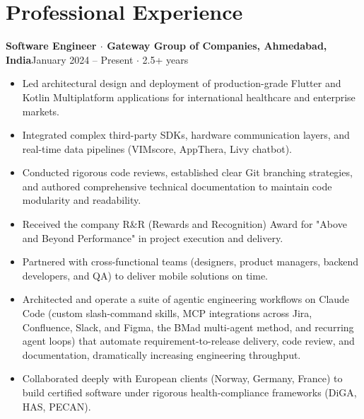 \documentclass[a4paper,10pt]{article}
\newcommand{\entry}[2]{\textbf{#1}\hfill{\small #2}\par}
\begin{document}
\section*{Professional Experience}
\entry{Software Engineer $\cdot$ Gateway Group of Companies, Ahmedabad, India}{January 2024 -- Present $\cdot$ 2.5+ years}
\begin{itemize}
  \item Led architectural design and deployment of production-grade Flutter and Kotlin Multiplatform applications for international healthcare and enterprise markets.
  \item Integrated complex third-party SDKs, hardware communication layers, and real-time data pipelines (VIMscore, AppThera, Livy chatbot).
  \item Conducted rigorous code reviews, established clear Git branching strategies, and authored comprehensive technical documentation to maintain code modularity and readability.
  \item Received the company R\&R (Rewards and Recognition) Award for "Above and Beyond Performance" in project execution and delivery.
  \item Partnered with cross-functional teams (designers, product managers, backend developers, and QA) to deliver mobile solutions on time.
  \item Architected and operate a suite of agentic engineering workflows on Claude Code (custom slash-command skills, MCP integrations across Jira, Confluence, Slack, and Figma, the BMad multi-agent method, and recurring agent loops) that automate requirement-to-release delivery, code review, and documentation, dramatically increasing engineering throughput.
  \item Collaborated deeply with European clients (Norway, Germany, France) to build certified software under rigorous health-compliance frameworks (DiGA, HAS, PECAN).
\end{itemize}
\end{document}
